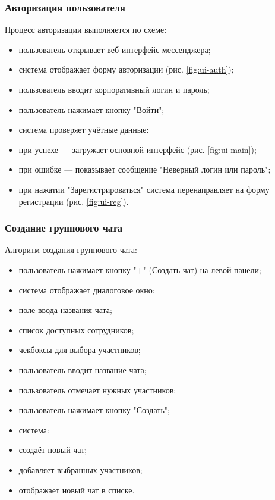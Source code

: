 \begin{itemize}
\subsubsection{Авторизация пользователя}  
Процесс авторизации выполняется по схеме:  
\begin{itemize}  
	\item пользователь открывает веб-интерфейс мессенджера;  
	\item система отображает форму авторизации (рис. \ref{fig:ui-auth});  
	\item пользователь вводит корпоративный логин и пароль;  
	\item пользователь нажимает кнопку "Войти";  
	\item система проверяет учётные данные:  
		\item при успехе — загружает основной интерфейс (рис. \ref{fig:ui-main});  
		\item при ошибке — показывает сообщение "Неверный логин или пароль";   
	\item при нажатии "Зарегистрироваться" система перенаправляет на форму регистрации (рис. \ref{fig:ui-reg}).  
\end{itemize}  

\subsubsection{Создание группового чата}  
Алгоритм создания группового чата:  
\begin{itemize}  
	\item пользователь нажимает кнопку "+" (Создать чат) на левой панели;  
	\item система отображает диалоговое окно:  
		\item поле ввода названия чата;  
		\item список доступных сотрудников;  
		\item чекбоксы для выбора участников;   
	\item пользователь вводит название чата;  
	\item пользователь отмечает нужных участников;  
	\item пользователь нажимает кнопку "Создать";  
	\item система:    
		\item создаёт новый чат;  
		\item добавляет выбранных участников;  
		\item отображает новый чат в списке.  
\end{itemize}  


\end{itemize}
